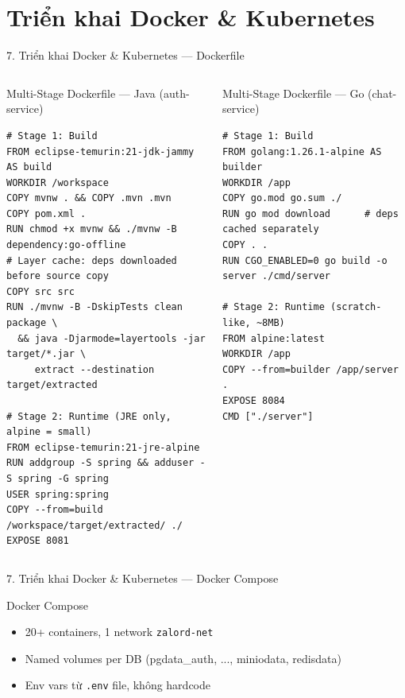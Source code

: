\documentclass[aspectratio=169,compress]{beamer}
\begin{document}
\section{Triển khai Docker \& Kubernetes}

\begin{frame}[fragile]{7. Triển khai Docker \& Kubernetes --- Dockerfile}
\begin{columns}[T]
\begin{block}{Multi-Stage Dockerfile --- Java (auth-service)}
\begin{lstlisting}
# Stage 1: Build
FROM eclipse-temurin:21-jdk-jammy AS build
WORKDIR /workspace
COPY mvnw . && COPY .mvn .mvn
COPY pom.xml .
RUN chmod +x mvnw && ./mvnw -B dependency:go-offline
# Layer cache: deps downloaded before source copy
COPY src src
RUN ./mvnw -B -DskipTests clean package \
  && java -Djarmode=layertools -jar target/*.jar \
     extract --destination target/extracted

# Stage 2: Runtime (JRE only, alpine = small)
FROM eclipse-temurin:21-jre-alpine
RUN addgroup -S spring && adduser -S spring -G spring
USER spring:spring
COPY --from=build /workspace/target/extracted/ ./
EXPOSE 8081
\end{lstlisting}
\end{block}

\begin{block}{Multi-Stage Dockerfile --- Go (chat-service)}
\begin{lstlisting}
# Stage 1: Build
FROM golang:1.26.1-alpine AS builder
WORKDIR /app
COPY go.mod go.sum ./
RUN go mod download      # deps cached separately
COPY . .
RUN CGO_ENABLED=0 go build -o server ./cmd/server

# Stage 2: Runtime (scratch-like, ~8MB)
FROM alpine:latest
WORKDIR /app
COPY --from=builder /app/server .
EXPOSE 8084
CMD ["./server"]
\end{lstlisting}
\end{block}
\end{columns}
\end{frame}

\begin{frame}{7. Triển khai Docker \& Kubernetes --- Docker Compose}
\begin{block}{Docker Compose}
\begin{itemize}
  \item 20+ containers, 1 network \texttt{zalord-net}
  \item Named volumes per DB (pgdata\_auth, ..., miniodata, redisdata)
  \item Env vars từ \texttt{.env} file, không hardcode
\end{itemize}
\end{block}
\end{frame}
\end{document}
